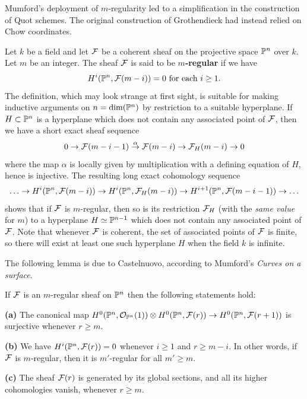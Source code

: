 


Mumford's deployment of $m$-regularity led to a simplification in the
construction of Quot schemes. The original construction of Grothendieck
had instead relied on Chow coordinates.




\begin{definition}\label{nhq-regularity}
Let $k$ be a field and let $\mathcal{F}$ be a coherent sheaf on the
projective space $\mathbb{P}^n$ over $k$. Let $m$ be an integer.
The sheaf $\mathcal{F}$ is said to be \textbf{$m$-regular} if we have
$$H^i(\mathbb{P}^n, \mathcal{F}(m-i)) =0\mbox{ for each }i \ge 1.$$
The definition, which may look strange at first sight, is suitable
for making inductive arguments on $n=\operatorname{dim}(\mathbb{P}^n)$
by restriction to a suitable hyperplane. If $H\subset \mathbb{P}^n$ is
a hyperplane which does not contain any associated point of $\mathcal{F}$,
then we have a short exact sheaf sequence
$$0 \to \mathcal{F}(m-i-1) \stackrel{\alpha}{\to} \mathcal{F}(m-i) \to \mathcal{F}_H(m-i)\to 0$$
where the map $\alpha$ is locally given by multiplication with
a defining equation of $H$, hence is injective.
The resulting long exact cohomology sequence
$$\ldots \to H^i(\mathbb{P}^n, \mathcal{F}(m-i)) \to H^i(\mathbb{P}^n, \mathcal{F}_H(m-i))
\to H^{i+1}(\mathbb{P}^n, \mathcal{F}(m-i-1)) \to \ldots$$
shows that if $\mathcal{F}$ is $m$-regular, then so is its restriction $\mathcal{F}_H$
(with the \textit{same value\,} for $m$)
to a hyperplane $H\simeq \mathbb{P}^{n-1}$ which does not contain any
associated point of $\mathcal{F}$.
Note that whenever $\mathcal{F}$ is coherent, the set of associated points of
$\mathcal{F}$ is finite, so there will exist at least one such hyperplane $H$
when the field $k$ is infinite.
\end{definition}

The following lemma is due to Castelnuovo, according to
Mumford's {\sl Curves on a surface}.

\begin{lemma}\label{nhq-castelnuovo}
If $\mathcal{F}$ is an $m$-regular sheaf on $\mathbb{P}^n$ then
the following statements hold:

\textbf{(a)} The canonical map $H^0(\mathbb{P}^n,{\mathcal O}_{\mathbb{P}^n}(1))\otimes
H^0(\mathbb{P}^n,\mathcal{F}(r)) \to H^0(\mathbb{P}^n,\mathcal{F}(r+1))$ is surjective
whenever $r\ge m$.

\textbf{(b)} We have $H^i(\mathbb{P}^n, \mathcal{F}(r))=0$ whenever $i \ge 1$ and $r\ge m-i$.
In other words, if $\mathcal{F}$ is $m$-regular, then it is $m'$-regular for all
$m' \ge m$.


\textbf{(c)} The sheaf $\mathcal{F}(r)$ is generated by its global sections,
and all its higher cohomologies vanish, whenever $r\ge m$.
\end{lemma}

